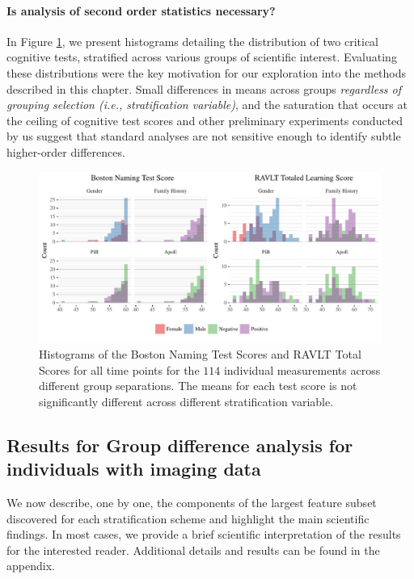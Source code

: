 \paragraph{Is analysis of second order statistics necessary?} In Figure \ref{fig:imagehists}, we present histograms detailing the distribution of two critical cognitive tests, stratified across various groups of scientific interest. Evaluating these distributions were the key motivation for our exploration into the methods described in this chapter. Small differences in means across groups {\em regardless of grouping selection (i.e., stratification variable)}, and the saturation that occurs at the ceiling of cognitive test scores and other preliminary experiments conducted by us suggest that standard analyses are not sensitive enough to identify subtle higher-order differences.
\begin{figure}
	\centering
	\includegraphics[width=\textwidth]{3_covtraj/figs/hists.pdf}
	\caption[Summary histograms of neuropsychological test scores for preclinical AD participants]{Histograms of the Boston Naming Test Scores and RAVLT Total Scores for all time points for the $114$ individual measurements across different group separations. The means for each test score is not significantly different across different stratification variable.}
	\label{fig:imagehists}
\end{figure}
\subsection{Results for Group difference analysis for individuals with imaging data}
We now describe, one by one, the components of the largest feature subset discovered for each stratification scheme 
and highlight the main scientific findings. In most cases, we provide a brief scientific interpretation of the results
for the interested reader. 
Additional details and results can be found in the appendix.
%

